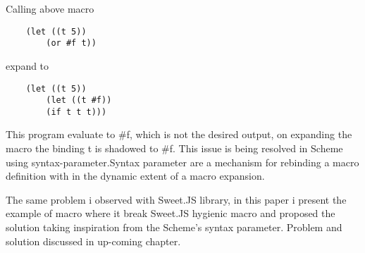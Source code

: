 Calling above macro 
\begin{lstlisting}
 	(let ((t 5))
  		(or #f t))
\end{lstlisting} 
  expand to 

\begin{lstlisting} 
  	(let ((t 5))
  		(let ((t #f))
    	(if t t t)))
\end{lstlisting} 
    
    This program evaluate to \#f, which is not the desired output, on expanding the macro the binding t is shadowed to \#f. This issue is being resolved in Scheme using syntax-parameter.Syntax parameter are a mechanism for rebinding a macro definition with in the dynamic extent of a macro expansion.

The same problem i observed with Sweet.JS library, in this paper i present the example of macro where it break Sweet.JS hygienic macro and proposed the solution taking inspiration from the Scheme's syntax parameter. Problem and solution discussed in up-coming chapter.